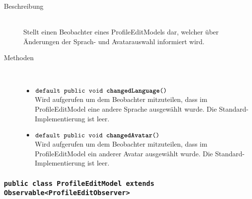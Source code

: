 \begin{description}
\item[Beschreibung] \hfill \\ Stellt einen Beobachter eines ProfileEditModels dar, welcher über Änderungen der Sprach- und Avatarauswahl informiert wird.

\item[Methoden] \hfill \\
	\vspace{-.8cm}
	\begin{itemize}
		\item $\texttt{default public void \textbf{changedLanguage}()}$ \\ Wird aufgerufen um dem Beobachter mitzuteilen, 
		dass im ProfileEditModel eine andere Sprache ausgewählt wurde. Die Standard-Implementierung ist leer.
		\item $\texttt{default public void \textbf{changedAvatar}()}$ \\ Wird aufgerufen um dem Beobachter mitzuteilen, 
		dass im ProfileEditModel ein anderer Avatar ausgewählt wurde. Die Standard-Implementierung ist leer.
	\end{itemize}
\end{description}

\subsubsection{\normalfont \texttt{public class \textbf{ProfileEditModel} extends Observable<ProfileEditObserver>}}

